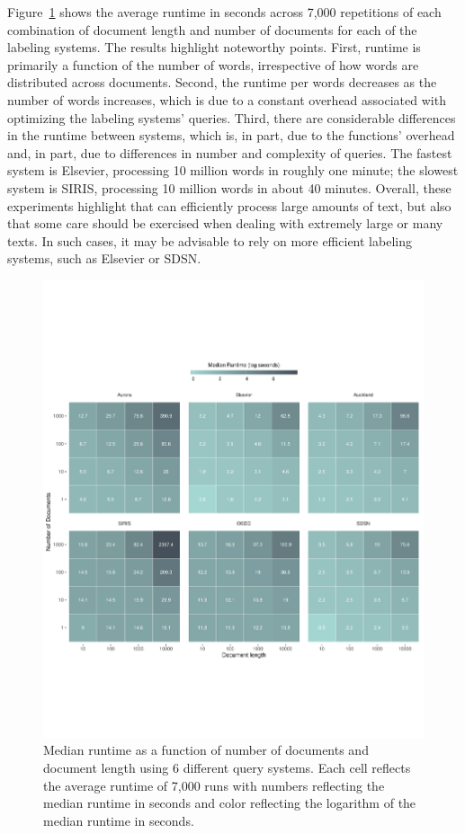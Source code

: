 Figure~\ref{figure:benchmark_plot} shows the average runtime in seconds across 7,000 repetitions of each combination of document length and number of documents for each of the labeling systems. The results highlight noteworthy points. First, runtime is primarily a function of the number of words, irrespective of how words are distributed across documents. Second, the runtime per words decreases as the number of words increases, which is due to a constant overhead associated with optimizing the labeling systems' queries. Third, there are considerable differences in the runtime between systems, which is, in part, due to the functions' overhead and, in part, due to differences in number and complexity of queries. The fastest system is Elsevier, processing 10 million words in roughly one minute; the slowest system is SIRIS, processing 10 million words in about 40 minutes. 
 Overall, these experiments highlight that  can efficiently process large amounts of text, but also that some care should be exercised when dealing with extremely large or many texts. In such cases, it may be advisable to rely on more efficient labeling systems, such as Elsevier or SDSN.   

\begin{figure}[htbp]
  \centering
   \includegraphics[width=1\linewidth]{benchmark_revision_final.pdf}
  \caption{Median runtime as a function of number of documents and document length using 6 different query systems. Each cell reflects the average runtime of 7,000 runs with numbers reflecting the median runtime in seconds and color reflecting the logarithm of the median runtime in seconds.}
  \label{figure:benchmark_plot}
\end{figure}

